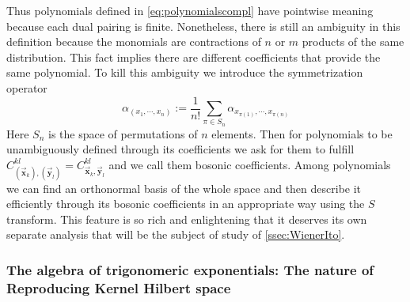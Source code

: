 \documentclass{elsarticle}%
\begin{document}
 Thus polynomials defined in \eqref{eq:polynomialscompl}  have pointwise meaning because each dual pairing is finite. Nonetheless, there is still an ambiguity  in this definition  because the monomials are contractions of  $n$ or $m$ products of the same distribution. This fact implies there are different coefficients that provide the same polynomial. To kill this ambiguity we introduce the symmetrization operator 
    \begin{equation}
    \label{eq:symmetrization}
    \alpha_{(x_1,\cdots,x_n)}:=\frac{1}{n!}\sum_{\pi\in S_n}\alpha_{x_{\pi(1)},\cdots,x_{\pi(n)}}
    \end{equation}
    Here $S_n$ is the space of permutations of $n$ elements. Then for polynomials to be unambiguously defined through its coefficients we ask for them to fulfill $C^{kl}_{(\vec{\mathbf{x}}_k),(\vec{\mathbf{y}}_l)}=C^{kl}_{\vec{\mathbf{x}}_k,\vec{\mathbf{y}}_l}$ and we call them bosonic coefficients. Among polynomials we can find an orthonormal basis of the whole space and then describe it efficiently through its bosonic coefficients in an appropriate way using the $S$ transform. This feature is so rich and enlightening that it deserves its own separate analysis that will be the subject of study of \autoref{ssec:WienerIto}. 
 
\subsubsection{ The algebra of trigonomeric exponentials: The nature of Reproducing Kernel Hilbert space}
\end{document}
